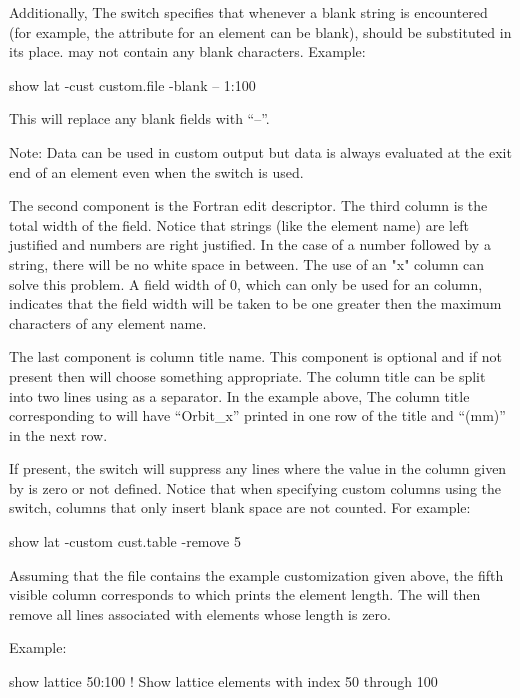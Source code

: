{{{\begin{description}
Additionally, The  switch specifies
that whenever a blank string is encountered (for example, the
 attribute for an element can be blank),  should
be substituted in its place.  may not contain any blank
characters. Example:
\begin{example}
  show lat -cust custom.file -blank -- 1:100
\end{example}
This will replace any blank fields with ``--''.

Note: Data can be used in custom output but data is always evaluated at
the exit end of an element even when the  switch is used.

The second component is the Fortran edit descriptor. The third column
is the total width of the field. Notice that strings (like the element
name) are left justified and numbers are right justified. In the case
of a number followed by a string, there will be no white space in
between. The use of an "x" column can solve this problem. A field
width of 0, which can only be used for an  column,
indicates that the field width will be taken to be one greater then
the maximum characters of any element name.

The last component is column title name. This component is optional
and if not present then \tao will choose something appropriate. The
column title can be split into two lines using  as a separator.
In the example above, The column title corresponding to  
will have ``Orbit_x'' printed in one row of the title and ``(mm)'' in the next row.

If present, the  switch will
suppress any lines where the value in the column given by  is zero or not defined. Notice that when specifying custom columns using the
 switch, columns that only insert blank space
are not counted. For example:
\begin{example}
  show lat -custom cust.table -remove 5
\end{example}
Assuming that the file  contains the example
customization given above, the fifth visible column corresponds to
 which prints the element length. The 
will then remove all lines associated with elements whose length is
zero.

Example:
\begin{example}
  show lattice 50:100         ! Show lattice elements with index 50 through 100
\end{example}


\end{description}}}}
